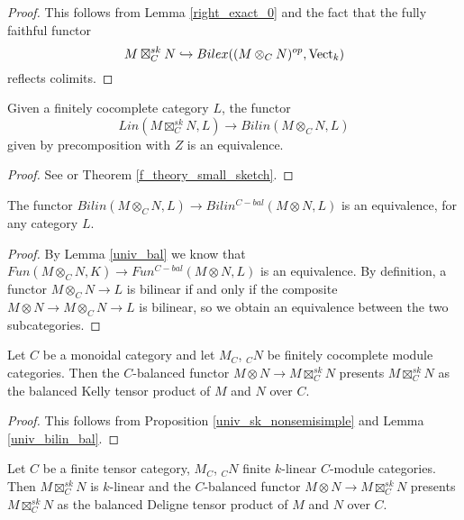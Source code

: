 \begin{proof}
  This follows from Lemma \ref{right_exact_0} and the fact that the fully
  faithful functor $$M\boxtimes_C^{sk}N\hookrightarrow Bilex((M\otimes_C
  N)^{op},\operatorname{Vect}_k)$$ reflects colimits.
\end{proof}

\begin{proposition}\label{univ_sk_nonsemisimple}

  \noindent Given a finitely cocomplete category $L$, the
  functor $$Lin(M\boxtimes_C^{sk}N,L)\to Bilin(M\otimes_C N, L)$$ given by
  precomposition with $Z$ is an equivalence.
\end{proposition}

\begin{proof}
  See \cite[Theorem 6.23]{kelly/basic-concepts-enriched} or Theorem
  \ref{f_theory_small_sketch}.
\end{proof}

\begin{lemma}\label{univ_bilin_bal}

  \noindent The functor $Bilin(M\otimes_C N,L)\to Bilin^{C-bal}(M\otimes N,
  L)$ is an equivalence, for any category $L$.
\end{lemma}

\begin{proof}
By Lemma \ref{univ_bal} we know that $Fun(M\otimes_C N,K)\to
Fun^{C-bal}(M\otimes N, L)$ is an equivalence. By definition, a functor
$M\otimes_C N\to L$ is bilinear if and only if the composite $M\otimes N\to
M\otimes_C N\to L$ is bilinear, so we obtain an equivalence between the two
subcategories.
\end{proof}

\begin{theorem}\label{main_nonsemisimple}

  \noindent Let $C$ be a monoidal category and let $M_C$, $_{C}N$ be finitely
  cocomplete module categories. Then the $C$-balanced functor $M\otimes N\to
  M\boxtimes_C^{sk}N$ presents $M\boxtimes_C^{sk}N$ as the balanced Kelly
  tensor product of $M$ and $N$ over $C$.
\end{theorem}

\begin{proof}

This follows from Proposition \ref{univ_sk_nonsemisimple} and Lemma
\ref{univ_bilin_bal}.
\end{proof}

\begin{corollary}

  \noindent Let $C$ be a finite tensor category, $M_C$, $_{C}N$ finite
  $k$-linear $C$-module categories. Then $M\boxtimes_C^{sk}N$ is $k$-linear
  and the $C$-balanced functor $M\otimes N\to M\boxtimes_C^{sk}N$ presents
  $M\boxtimes_C^{sk}N$ as the balanced Deligne tensor product of $M$ and $N$
  over $C$.
\end{corollary}

